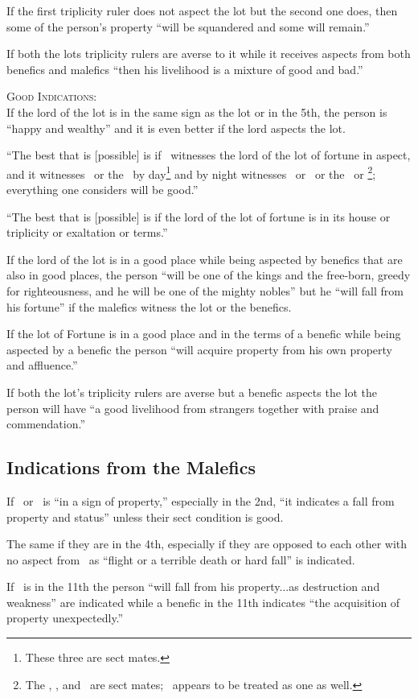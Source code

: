 If the first triplicity ruler does not aspect the lot but the second one does, then some of the person's property ``will be squandered and some will remain.''

If both the lots triplicity rulers are averse to it while it receives aspects from both benefics and malefics ``then his livelihood is a mixture of good and bad.''

\noindent\textsc{Good Indications:} \hfill \\
If the lord of the lot is in the same sign as the lot or in the 5th, the person is ``happy and wealthy'' and it is even better if the lord aspects the lot.

``The best that is [possible] is if \Saturn\, witnesses the lord of the lot of fortune in aspect, and it witnesses \Jupiter\, or the \Sun\, by day\footnote{These three are sect mates.} and by night witnesses \Mars\, or \Venus\, or the \Moon\, or \Mercury\footnote{The \Moon, \Venus, and \Mars\, are sect mates; \Mercury\, appears to be treated as one as well.}; everything one considers will be good.''

``The best that is [possible] is if the lord of the lot of fortune is in its house or triplicity or exaltation or terms.''

If the lord of the lot is in a good place while being aspected by benefics that are also in good places, the person ``will be one of the kings and the free-born, greedy for righteousness, and he will be one of the mighty nobles'' but he ``will fall from his fortune'' if the malefics witness the lot or the benefics.

If the lot of Fortune is in a good place and in the terms of a benefic while being aspected by a benefic the person ``will acquire property from his own property and affluence.''

If both the lot's triplicity rulers are averse but a benefic aspects the lot the person will have ``a good livelihood from strangers together with praise and commendation.''

\subsection{Indications from the Malefics}
If \Saturn\, or \Mars\, is ``in a sign of property,''  especially in the 2nd, ``it indicates a fall from property and status'' unless their sect condition is good.

The same if they are in the 4th, especially if they are opposed to each other with no aspect from \Jupiter\, as ``flight or a terrible death or hard fall'' is indicated.

If \Mars\, is in the 11th the person ``will fall from his property...as destruction and weakness'' are indicated while a benefic in the 11th indicates ``the acquisition of property unexpectedly.''



